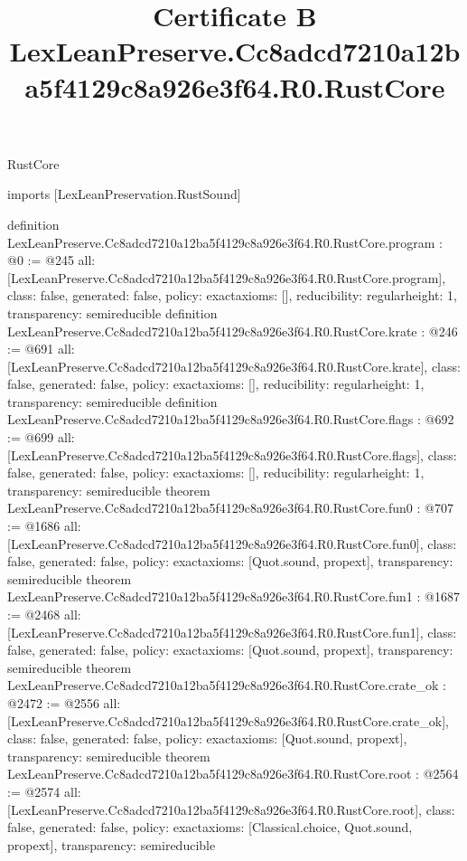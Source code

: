 \begin{lexlean}{RustCore}
\title{Certificate B LexLeanPreserve.Cc8adcd7210a12ba5f4129c8a926e3f64.R0.RustCore}
\begin{coremodule}
imports [LexLeanPreservation.RustSound]

definition LexLeanPreserve.Cc8adcd7210a12ba5f4129c8a926e3f64.R0.RustCore.program : @0 := @245 {
  all: [LexLeanPreserve.Cc8adcd7210a12ba5f4129c8a926e3f64.R0.RustCore.program],
  class: false,
  generated: false,
  policy: exact{axioms: []},
  reducibility: regular{height: 1},
  transparency: semireducible
}
definition LexLeanPreserve.Cc8adcd7210a12ba5f4129c8a926e3f64.R0.RustCore.krate : @246 := @691 {
  all: [LexLeanPreserve.Cc8adcd7210a12ba5f4129c8a926e3f64.R0.RustCore.krate],
  class: false,
  generated: false,
  policy: exact{axioms: []},
  reducibility: regular{height: 1},
  transparency: semireducible
}
definition LexLeanPreserve.Cc8adcd7210a12ba5f4129c8a926e3f64.R0.RustCore.flags : @692 := @699 {
  all: [LexLeanPreserve.Cc8adcd7210a12ba5f4129c8a926e3f64.R0.RustCore.flags],
  class: false,
  generated: false,
  policy: exact{axioms: []},
  reducibility: regular{height: 1},
  transparency: semireducible
}
theorem LexLeanPreserve.Cc8adcd7210a12ba5f4129c8a926e3f64.R0.RustCore.fun0 : @707 := @1686 {
  all: [LexLeanPreserve.Cc8adcd7210a12ba5f4129c8a926e3f64.R0.RustCore.fun0],
  class: false,
  generated: false,
  policy: exact{axioms: [Quot.sound, propext]},
  transparency: semireducible
}
theorem LexLeanPreserve.Cc8adcd7210a12ba5f4129c8a926e3f64.R0.RustCore.fun1 : @1687 := @2468 {
  all: [LexLeanPreserve.Cc8adcd7210a12ba5f4129c8a926e3f64.R0.RustCore.fun1],
  class: false,
  generated: false,
  policy: exact{axioms: [Quot.sound, propext]},
  transparency: semireducible
}
theorem LexLeanPreserve.Cc8adcd7210a12ba5f4129c8a926e3f64.R0.RustCore.crate_ok : @2472 := @2556 {
  all: [LexLeanPreserve.Cc8adcd7210a12ba5f4129c8a926e3f64.R0.RustCore.crate_ok],
  class: false,
  generated: false,
  policy: exact{axioms: [Quot.sound, propext]},
  transparency: semireducible
}
theorem LexLeanPreserve.Cc8adcd7210a12ba5f4129c8a926e3f64.R0.RustCore.root : @2564 := @2574 {
  all: [LexLeanPreserve.Cc8adcd7210a12ba5f4129c8a926e3f64.R0.RustCore.root],
  class: false,
  generated: false,
  policy: exact{axioms: [Classical.choice, Quot.sound, propext]},
  transparency: semireducible
}


\end{coremodule}
\end{lexlean}
